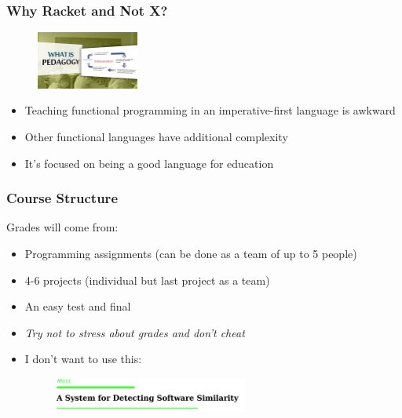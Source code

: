 \documentclass{beamer}
\begin{document}
\begin{frame}
  \frametitle{Why Racket and Not X?}
  \begin{figure}[t]
    \centering \includegraphics[width=0.3\textwidth]{images/pedagogy.jpg}
  \end{figure}
  \begin{itemize}
    \item<2-> Teaching functional programming in an imperative-first language is awkward
    \item<3-> Other functional languages have additional complexity
    \item<4-> It's focused on being a good language for education
  \end{itemize}
\end{frame}

\begin{frame}
  \frametitle{Course Structure}
  Grades will come from:
  \begin{itemize}
  \item<1-> Programming assignments (can be done as a team of up to 5 people)
  \item<2-> 4-6 projects (individual but last project as a team)    
  \item<3-> An easy test and final    
  \item<4-> \emph{Try not to stress about grades and \emph{don't cheat}}
  \item<5-> I don't want to use this:
    \begin{figure}[t]
      \includegraphics[width=0.6\textwidth]{images/moss.png}
    \end{figure}
  \end{itemize}
\end{frame}
\end{document}
